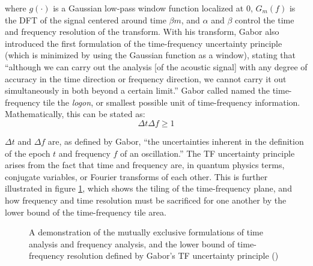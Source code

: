 \documentclass[report.tex]{subfiles}
\begin{document}
where $g(\cdot)$ is a Gaussian low-pass window function localized at 0, $G_{m}(f)$ is the DFT of the signal centered around time $\beta m$, and $\alpha$ and $\beta$ control the time and frequency resolution of the transform. With his transform, Gabor also introduced the first formulation of the time-frequency uncertainty principle (which is minimized by using the Gaussian function as a window), stating that ``although we can carry out the analysis [of the acoustic signal] with any degree of accuracy in the time direction or frequency direction, we cannot carry it out simultaneously in both beyond a certain limit.'' Gabor called named the time-frequency tile the \textit{logon}, or smallest possible unit of time-frequency information. Mathematically, this can be stated as:
\[ \Delta t\Delta f \ge 1 \]

$\Delta t$ and $\Delta f$ are, as defined by Gabor, ``the uncertainties inherent in the definition of the epoch $t$ and frequency $f$ of an oscillation.'' The TF uncertainty principle arises from the fact that time and frequency are, in quantum physics terms, conjugate variables, or Fourier transforms of each other. This is further illustrated in figure \ref{fig:gabortf}, which shows the tiling of the time-frequency plane, and how frequency and time resolution must be sacrificed for one another by the lower bound of the time-frequency tile area.

\begin{figure}[ht]
	\centering
	\hspace{0.1em}
	\caption{A demonstration of the mutually exclusive formulations of time analysis and frequency analysis, and the lower bound of time-frequency resolution defined by Gabor's TF uncertainty principle (\cite{gabordiagrams})}
	\label{fig:gabortf}
\end{figure}
\end{document}
